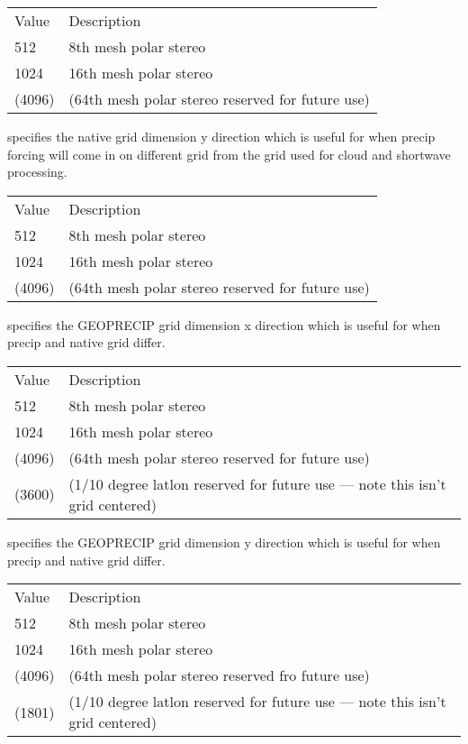  \begin{tabular}{ll}
 Value  & Description                                      \\
 512    & 8th mesh polar stereo                            \\
 1024   & 16th mesh polar stereo                           \\
 (4096) & (64th mesh polar stereo reserved for future use) \\
 \end{tabular}

  specifies the native grid dimension
 y direction which is useful for when precip forcing will come
 in on different grid from the grid used for cloud and shortwave
 processing.

 \begin{tabular}{ll}
 Value  & Description                                      \\
 512    & 8th mesh polar stereo                            \\
 1024   & 16th mesh polar stereo                           \\
 (4096) & (64th mesh polar stereo reserved for future use) \\
 \end{tabular}

  specifies the GEOPRECIP grid dimension
 x direction which is useful for when precip and native grid differ.

 \begin{tabular}{ll}
 Value  & Description                                      \\
 512    & 8th mesh polar stereo                            \\
 1024   & 16th mesh polar stereo                           \\
 (4096) & (64th mesh polar stereo reserved for future use) \\
 (3600) & (1/10 degree latlon reserved for future use --- note
          this isn't grid centered) \\
 \end{tabular}

  specifies the GEOPRECIP grid dimension
 y direction which is useful for when precip and native grid differ.

 \begin{tabular}{ll}
 Value  & Description                                      \\
 512    & 8th mesh polar stereo                            \\
 1024   & 16th mesh polar stereo                           \\
 (4096) & (64th mesh polar stereo reserved fro future use) \\
 (1801) & (1/10 degree latlon reserved for future use --- note
          this isn't grid centered) \\
 \end{tabular}

